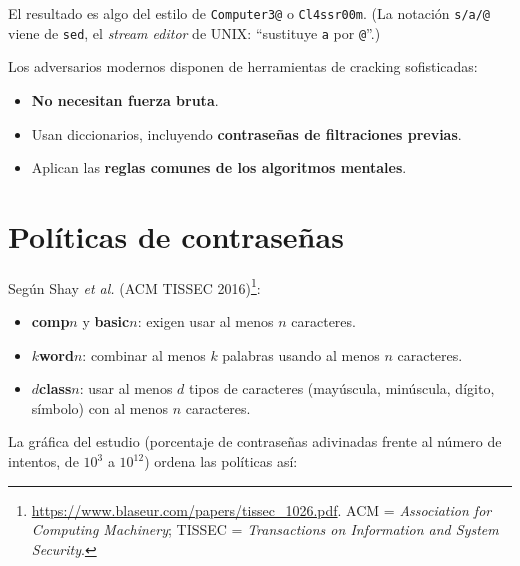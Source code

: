 \documentclass[11pt,a4paper]{report}
\begin{document}
El resultado es algo del estilo de \texttt{Computer3@} o \texttt{Cl4ssr00m}. (La notación \texttt{s/a/@} viene de \texttt{sed}, el \emph{stream editor} de UNIX: ``sustituye \texttt{a} por \texttt{@}''.)
 
\begin{importante}
Los adversarios modernos disponen de herramientas de cracking sofisticadas:
\begin{itemize}
  \item \textbf{No necesitan fuerza bruta}.
  \item Usan diccionarios, incluyendo \textbf{contraseñas de filtraciones previas}.
  \item Aplican las \textbf{reglas comunes de los algoritmos mentales}.
\end{itemize}
\end{importante}
 
\section{Políticas de contraseñas}
 
Según Shay \emph{et al.} (ACM TISSEC 2016)\footnote{\url{https://www.blaseur.com/papers/tissec_1026.pdf}. ACM = \emph{Association for Computing Machinery}; TISSEC = \emph{Transactions on Information and System Security}.}:
 
\begin{itemize}
  \item \textbf{comp$n$} y \textbf{basic$n$}: exigen usar al menos $n$ caracteres.
  \item \textbf{$k$word$n$}: combinar al menos $k$ palabras usando al menos $n$ caracteres.
  \item \textbf{$d$class$n$}: usar al menos $d$ tipos de caracteres (mayúscula, minúscula, dígito, símbolo) con al menos $n$ caracteres.
\end{itemize}
 
La gráfica del estudio (porcentaje de contraseñas adivinadas frente al número de intentos, de $10^3$ a $10^{12}$) ordena las políticas así:
 
\begin{center}
\end{center}
 
\end{document}
